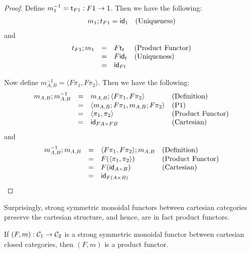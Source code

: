 \begin{proof}
  Define $m^{-1}_1 = \t_{F 1} : F1 \mto 1$.  Then we have the following:
  \[
  \begin{array}{lll}
    m_1;t_{F1} = \mathsf{id}_{1} & \text{(Uniqueness)}\\    
  \end{array}
  \]
  and
  \[
  \begin{array}{llll}
    t_{F1};m_1
    & = & F\mathsf{t}_t & \text{(Product Functor)}\\
    & = & F\mathsf{id}_t & \text{(Uniqueness)}\\
    & = & \mathsf{id}_{Ft}     
  \end{array}
  \]

  Now define $m^{-1}_{A,B} = \langle F\pi_1, F\pi_2 \rangle$.  Then we have the following:
  \[
  \begin{array}{llll}
    m_{A,B};m^{-1}_{A,B}
    & = & m_{A,B};\langle F\pi_1, F\pi_2 \rangle & \text{(Definition)}\\
    & = & \langle m_{A,B};F\pi_1, m_{A,B};F\pi_2 \rangle & \text{(P1)}\\
    & = & \langle \pi_1, \pi_2 \rangle & \text{(Product Functor)}\\
    & = & \mathsf{id}_{FA \times FB} & \text{(Cartesian)}\\
  \end{array}
  \]
  and
  \[
  \begin{array}{llll}
    m^{-1}_{A,B};m_{A,B}
    & = & \langle F\pi_1, F\pi_2 \rangle;m_{A,B} & \text{(Definition)}\\
    & = & F(\langle \pi_1, \pi_2 \rangle) & \text{(Product Functor)}\\
    & = & F(\mathsf{id}_{A \times B}) & \text{(Cartesian)}\\
    & = & \mathsf{id}_{F(A \times B)}\\    
  \end{array}
  \]
\end{proof}
\fi
\noindent
Surprisingly, strong symmetric monoidal functors between cartesian
categories preserve the cartesian structure, and hence, are in fact
product functors.  
\begin{lemma}
  \label{lemma:strong-symmetric_monoidal_functors_are_product_functors}
  If $(F,m) : \cat{C}_1 \mto \cat{C}_2$ is a strong symmetric monoidal
  functor between cartesian closed categories, then $(F,m)$ is a
  product functor.
\end{lemma}
\iffalse
